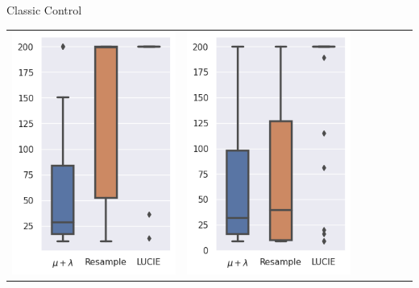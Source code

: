 \begin{frame}{\tcv{} Classic Control}
\begin{table}
\begin{tabular}{ccccccc}
            \includegraphics[width=\figwidth]{images/LUCIE/cartpole/boxplot_cartpole_600.png} &
            \includegraphics[width=\figwidth]{images/LUCIE/cartpole/boxplot_cartpole_800.png}\\
        \end{tabular}
    \end{table}


\end{frame}
